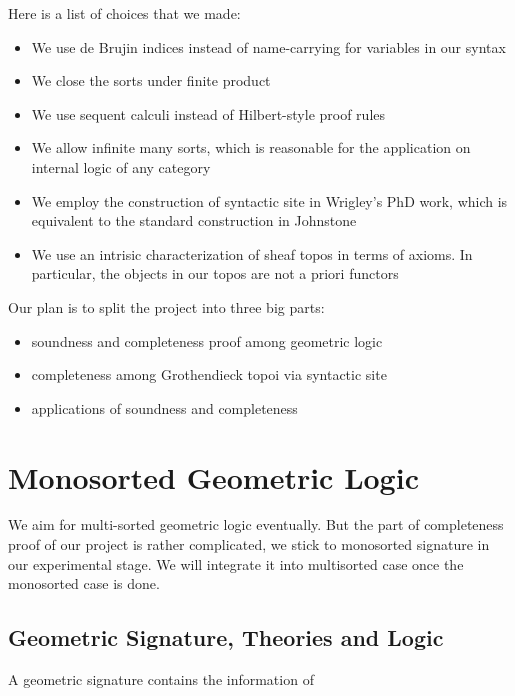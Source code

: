 Here is a list of choices that we made:
\begin{itemize}
  \item We use de Brujin indices instead of name-carrying for variables in our syntax
  \item We close the sorts under finite product
  \item We use sequent calculi instead of Hilbert-style proof rules
  \item We allow infinite many sorts, which is reasonable for the application on internal logic of any category
  \item We employ the construction of syntactic site in Wrigley's PhD work, which is equivalent to the standard construction
  in Johnstone
  \item We use an intrisic characterization of sheaf topos in terms of axioms. In particular, the objects in
  our topos are not a priori functors

\end{itemize}


Our plan is to split the project into three big parts:
\begin{itemize}
  \item soundness and completeness proof among geometric logic
  \item completeness among Grothendieck topoi via syntactic site
  \item applications of soundness and completeness
\end{itemize}

\chapter{Monosorted Geometric Logic}
We aim for multi-sorted geometric logic eventually. But the part of completeness proof of our project is rather complicated, we stick to
monosorted signature in our experimental stage. We will integrate it into multisorted case once the monosorted case is done.

\section{Geometric Signature, Theories and Logic}

\begin{definition}
A geometric signature contains the information of
\end{definition}




